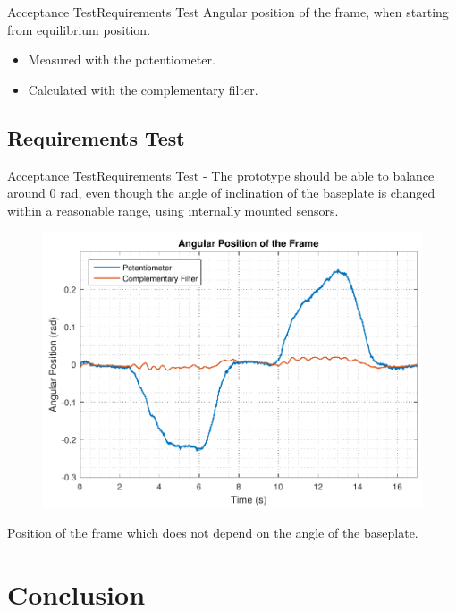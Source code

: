 \begin{frame}{Acceptance Test}{Requirements Test}
Angular position of the frame, when starting from equilibrium position.
	\begin{itemize}
		\item {Measured with the potentiometer.}
		\item {Calculated with the complementary filter.}
	\end{itemize}
	 
 
\end{frame}
\subsection{Requirements Test}

\begin{frame}{Acceptance Test}{Requirements Test}
- The prototype should be able to balance around 0 rad, even though the angle of inclination of the baseplate is changed within a reasonable range, using internally mounted sensors.
	
\begin{figure}
	\centering
	\includegraphics[scale=0.40]{Pictures/testReq2.pdf}
\end{figure}
Position of the frame which does not depend on the angle of the baseplate.
\end{frame}

\section{Conclusion}

